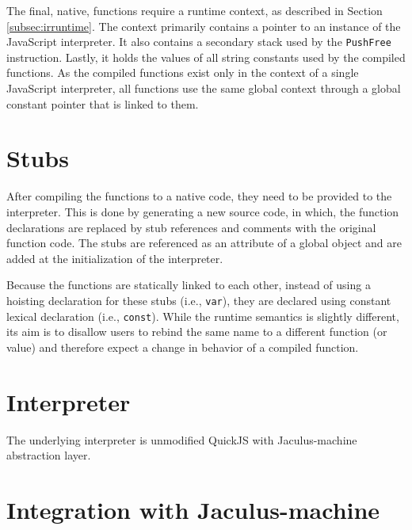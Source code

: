 The final, native, functions require a runtime context, as described in Section \ref{subsec:irruntime}. The context primarily contains a pointer to an instance of the JavaScript interpreter. It also contains a secondary stack used by the \texttt{PushFree} instruction. Lastly, it holds the values of all string constants used by the compiled functions. As the compiled functions exist only in the context of a single JavaScript interpreter, all functions use the same global context through a global constant pointer that is linked to them.


\section{Stubs}

After compiling the functions to a native code, they need to be provided to the interpreter. This is done by generating a new source code, in which, the function declarations are replaced by stub references and comments with the original function code. The stubs are referenced as an attribute of a global object and are added at the initialization of the interpreter.

Because the functions are statically linked to each other, instead of using a hoisting declaration for these stubs (i.e., \texttt{var}), they are declared using constant lexical declaration (i.e., \texttt{const}). While the runtime semantics is slightly different, its aim is to disallow users to rebind the same name to a different function (or value) and therefore expect a change in behavior of a compiled function.


\section{Interpreter}

The underlying interpreter is unmodified QuickJS with Jaculus-machine abstraction layer.

\section{Integration with Jaculus-machine}

